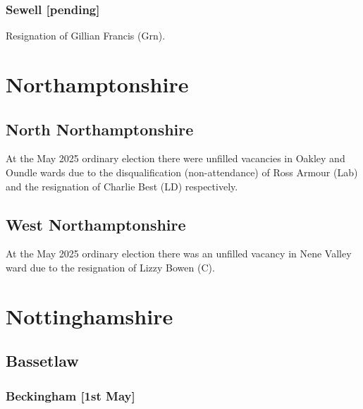 \documentclass[a4paper,openany]{book}
\begin{document}
\begin{resultsiii}
\subsubsection*{Sewell \hspace*{\fill}\nolinebreak[1]%
	\enspace\hspace*{\fill}
	[pending]}


Resignation of Gillian Francis (Grn).

\section{Northamptonshire}

\subsection*{North Northamptonshire}

At the May 2025 ordinary election there were unfilled vacancies in Oakley and Oundle wards due to the disqualification (non-attendance) of Ross Armour (Lab) and the resignation of Charlie Best (LD) respectively.%

\subsection*{West Northamptonshire}

At the May 2025 ordinary election there was an unfilled vacancy in Nene Valley ward due to the resignation of Lizzy Bowen (C).%

\section{Nottinghamshire}

\subsection*{Bassetlaw}

\subsubsection*{Beckingham \hspace*{\fill}\nolinebreak[1]%
	\enspace\hspace*{\fill}
	[1st May]}


\end{resultsiii}
\end{document}
